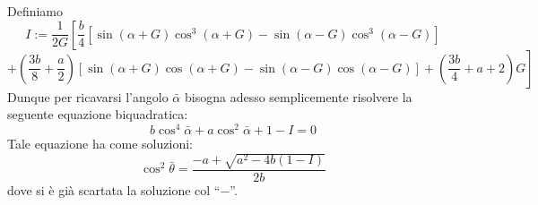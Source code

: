 Definiamo
$$ I := \frac{1}{2G} \left[ \frac{b}{4}\left[ \sin \left( \alpha + G \right) \cos^3 \left( \alpha + G \right) - \sin \left( \alpha - G \right) \cos^3 \left( \alpha - G \right) \right] \right. $$
$$ \left. + \left( \frac{3b}{8} + \frac{a}{2} \right)\left[ \sin \left( \alpha + G \right) \cos \left( \alpha + G \right) - \sin \left( \alpha - G \right) \cos \left( \alpha - G \right) \right] 
+ \left( \frac{3b}{4} + a + 2 \right) G \right] $$
Dunque per ricavarsi l'angolo $ \bar \alpha $ bisogna adesso semplicemente risolvere la seguente equazione biquadratica: 
$$ b \cos^4 \bar\alpha + a \cos ^ 2 \bar \alpha + 1 - I= 0 $$
Tale equazione ha come soluzioni:
$$ \cos^2 \bar \theta  = \frac{-a + \sqrt{a^2 - 4b(1 - I)}}{2b} $$
dove si è già scartata la soluzione col ``$-$''.
